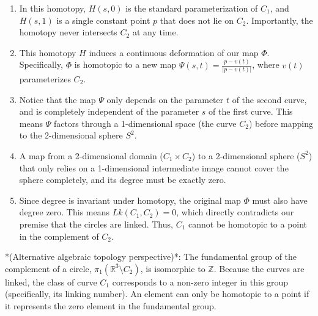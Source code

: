 \begin{solution}
\begin{enumerate}
    \item In this homotopy, $H(s, 0)$ is the standard parameterization of $C_1$, and $H(s, 1)$ is a single constant point $p$ that does not lie on $C_2$. Importantly, the homotopy never intersects $C_2$ at any time.

    \item This homotopy $H$ induces a continuous deformation of our map $\Phi$. Specifically, $\Phi$ is homotopic to a new map $\Psi(s, t) = \frac{p - v(t)}{|p - v(t)|}$, where $v(t)$ parameterizes $C_2$. 

    \item Notice that the map $\Psi$ only depends on the parameter $t$ of the second curve, and is completely independent of the parameter $s$ of the first curve. This means $\Psi$ factors through a 1-dimensional space (the curve $C_2$) before mapping to the 2-dimensional sphere $S^2$.

    \item A map from a 2-dimensional domain ($C_1 \times C_2$) to a 2-dimensional sphere ($S^2$) that only relies on a 1-dimensional intermediate image cannot cover the sphere completely, and its degree must be exactly zero. 

    \item Since degree is invariant under homotopy, the original map $\Phi$ must also have degree zero. This means $Lk(C_1, C_2) = 0$, which directly contradicts our premise that the circles are linked. Thus, $C_1$ cannot be homotopic to a point in the complement of $C_2$.
\end{enumerate}

\par\vspace{1em}
*(Alternative algebraic topology perspective)*: The fundamental group of the complement of a circle, $\pi_1(\mathbb{R}^3 \setminus C_2)$, is isomorphic to $\mathbb{Z}$. Because the curves are linked, the class of curve $C_1$ corresponds to a non-zero integer in this group (specifically, its linking number). An element can only be homotopic to a point if it represents the zero element in the fundamental group.
\end{solution}

